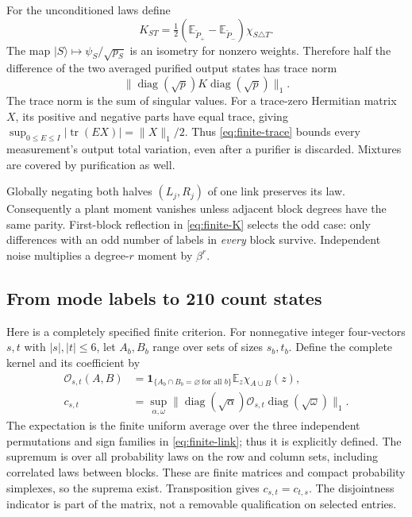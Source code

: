 \documentclass[11pt]{article}
\newcommand{\E}{\mathbb E}
\newcommand{\diag}{\operatorname{diag}}
\newcommand{\1}{\mathbf 1}
\DeclareMathOperator{\tr}{tr}
\begin{document}
For the unconditioned laws define
\begin{equation}\label{eq:finite-K}
 K_{ST}=\tfrac12(\E_{\widetilde P_+}-\E_{\widetilde P_-})
                                \chi_{S\triangle T}.
\end{equation}
The map $|S\rangle\mapsto\psi_S/\sqrt{p_S}$ is an isometry for nonzero
weights. Therefore half the difference of the two averaged purified
output states has trace norm
\begin{equation}\label{eq:finite-trace}
                   \|\diag(\sqrt p)K\diag(\sqrt p)\|_1.
\end{equation}
The trace norm is the sum of singular values. For a trace-zero Hermitian
matrix $X$, its positive and negative parts have equal trace, giving
$\sup_{0\le E\le I}|\tr(EX)|=\|X\|_1/2$.
Thus \eqref{eq:finite-trace} bounds every measurement's output total
variation, even after a purifier is discarded. Mixtures are covered
by purification as well.

Globally negating both halves $(L_j,R_j)$ of one link preserves its law.
Consequently a plant moment vanishes unless adjacent block degrees
have the same parity. First-block reflection in \eqref{eq:finite-K}
selects the odd case: only differences with an odd number of labels in
\emph{every} block survive. Independent noise multiplies a degree-$r$
moment by $\beta^r$.

\subsection{From mode labels to 210 count states}
Here is a completely specified finite criterion. For nonnegative
integer four-vectors $s,t$ with $|s|,|t|\le6$, let $A_b,B_b$ range over sets of sizes
$s_b,t_b$. Define the complete kernel and its coefficient by
\begin{align}
 \mathcal O_{s,t}(A,B)
   &=\1_{\{A_b\cap B_b=\varnothing\ \text{for all }b\}}
                      \E_z\chi_{A\cup B}(z),\label{eq:complete}\\
 c_{s,t}
   &=\sup_{\alpha,\omega}
       \|\diag(\sqrt\alpha)\mathcal O_{s,t}
                           \diag(\sqrt\omega)\|_1.\label{eq:cstar}
\end{align}
The expectation is the finite uniform average over the three independent
permutations and sign families in \eqref{eq:finite-link}; thus it is
explicitly defined. The supremum is over all probability laws on the
row and column sets, including correlated laws between blocks.
These are finite matrices and compact probability simplexes, so the
suprema exist. Transposition gives $c_{s,t}=c_{t,s}$.
The disjointness indicator is part of the matrix, not a removable
qualification on selected entries.
\end{document}
